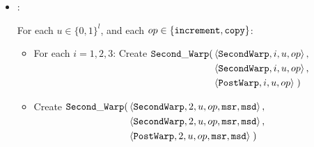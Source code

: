 \begin{itemize}
        \item {\secondwarp}:


        For each $u \in \{0, 1\}^l$, and each $op \in \{ {\tt increment, copy } \}$:
        \begin{itemize}
            \item For each $i = 1, 2, 3$: Create
            $\begin{aligned}[t]
                \secondwarp(& \left\langle {\tt SecondWarp}, i, u, \inc \right\rangle,   \\ %
                            & \left\langle {\tt SecondWarp}, i, u, \inc \right\rangle,   \\ %
                            & \left\langle {\tt PostWarp},   i, u, \inc \right\rangle \;)   %
            \end{aligned}$

            \vspace{0.5cm}

            \item Create
            $\begin{aligned}[t]
                \secondwarp(& \left\langle {\tt SecondWarp}, 2, u, \inc, {\tt msr}, {\tt msd} \right\rangle, \\ %
                            & \left\langle {\tt SecondWarp}, 2, u, \inc, {\tt msr}, {\tt msd} \right\rangle, \\ %
                            & \left\langle {\tt PostWarp},   2, u, \inc, {\tt msr}, {\tt msd} \right\rangle \;) %
            \end{aligned}$
            \vspace{0.5cm}


\end{itemize}
\end{itemize}

